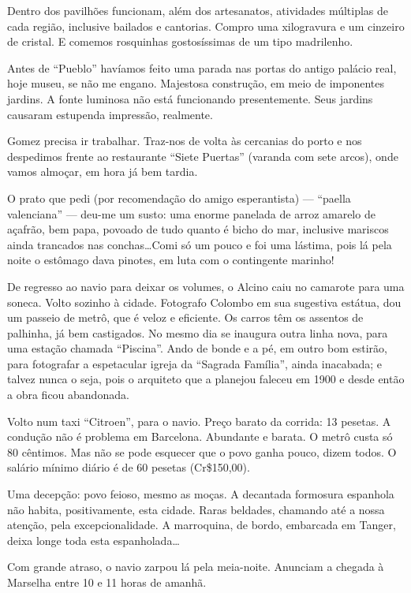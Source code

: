 Dentro dos pavilhões funcionam, além dos artesanatos, atividades múltiplas de cada região, inclusive bailados e cantorias. Compro uma xilogravura e um cinzeiro de cristal. E comemos rosquinhas gostosíssimas de um tipo madrilenho.

Antes de ``Pueblo'' havíamos feito uma parada nas portas do antigo palácio real, hoje museu, se não me engano. Majestosa construção, em meio de imponentes jardins. A fonte luminosa não está funcionando presentemente. Seus jardins causaram estupenda impressão, realmente.

Gomez precisa ir trabalhar. Traz-nos de volta às cercanias do porto e nos despedimos frente ao restaurante ``Siete Puertas'' (varanda com sete arcos), onde vamos almoçar, em hora já bem tardia.

O prato que pedi (por recomendação do amigo esperantista) --- ``paella valenciana'' --- deu-me um susto: uma enorme panelada de arroz amarelo de açafrão, bem papa, povoado de tudo quanto é bicho do mar, inclusive mariscos ainda trancados nas conchas\ldots Comi só um pouco e foi uma lástima, pois lá pela noite o estômago dava pinotes, em luta com o contingente marinho!

De regresso ao navio para deixar os volumes, o Alcino caiu no camarote para uma soneca. Volto sozinho à cidade. Fotografo Colombo em sua sugestiva estátua, dou um passeio de metrô, que é veloz e eficiente. Os carros têm os assentos de palhinha, já bem castigados. No mesmo dia se inaugura outra linha nova, para uma estação chamada ``Piscina''. Ando de bonde e a pé, em outro bom estirão, para fotografar a espetacular igreja da ``Sagrada Família'', ainda inacabada; e talvez nunca o seja, pois o arquiteto que a planejou faleceu em 1900 e desde então a obra ficou abandonada.

Volto num taxi ``Citroen'', para o navio. Preço barato da corrida: 13 pesetas. A condução não é problema em Barcelona. Abundante e barata. O metrô custa só 80 cêntimos. Mas não se pode esquecer que o povo ganha pouco, dizem todos. O salário mínimo diário é de 60 pesetas (Cr\$150,00).

Uma decepção: povo feioso, mesmo as moças. A decantada formosura espanhola não habita, positivamente, esta cidade. Raras beldades, chamando até a nossa atenção, pela excepcionalidade. A marroquina, de bordo, embarcada em Tanger, deixa longe toda esta espanholada\ldots

Com grande atraso, o navio zarpou lá pela meia-noite. Anunciam a chegada à Marselha entre 10 e 11 horas de amanhã.

